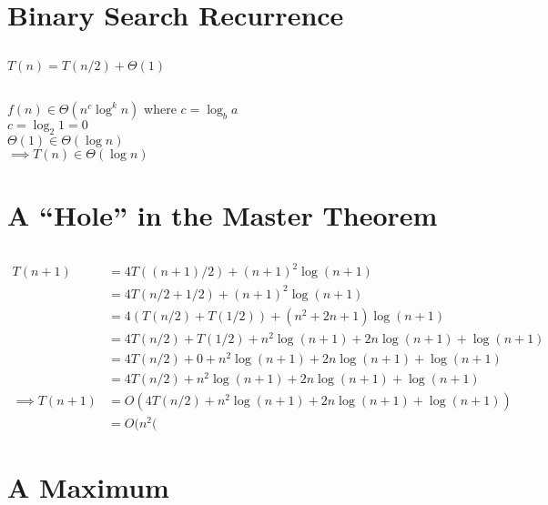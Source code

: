 \documentclass[14pt, letterpaper]{article}
\begin{document}
\section{Binary Search Recurrence}
\subsection{}
$T(n) = T(n/2) + \Theta(1)$

\subsection{}
$f(n) \in \Theta(n^c\log^k n)$ where $c = \log_b a$ \\
$c = \log_2 1 = 0$ \\
$\Theta(1) \in \Theta(\log n)$\\
$\implies T(n) \in \Theta(\log n)$

\section{A ``Hole'' in the Master Theorem}
\subsection{}
\subsection{}
\begin{align*}
T(n + 1) &= 4T((n + 1)/2) + (n+1)^2\log(n+1) \\
&= 4T(n/2 + 1/2) + (n + 1)^2\log(n+1) \\
&= 4(T(n/2) + T(1/2)) + (n^2 + 2n + 1)\log(n+1) \\
&= 4T(n/2) + T(1/2) + n^2\log(n+1) + 2n\log(n+1) + \log(n+1) \\
&= 4T(n/2) + 0 + n^2\log(n+1) + 2n\log(n+1) + \log(n+1) \\
&= 4T(n/2) + n^2\log(n+1) + 2n\log(n+1) + \log(n+1) \\
\implies T(n+1) &= O(4T(n/2) + n^2\log(n+1) + 2n\log(n+1) + \log(n+1)) \\
&= O(n^2(
\end{align*}
\subsection{}

\section{A Maximum}
\end{document}
